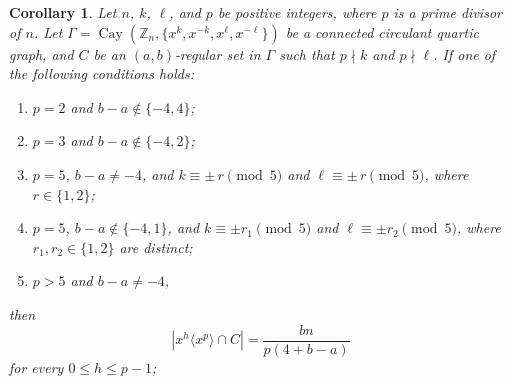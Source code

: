 \documentclass[10pt,a4paper]{amsart}
\newtheorem{cor}{Corollary}
\begin{document}
\begin{cor}\label{cor:coset-size2}
	Let $n$, $k$, $\ell$, and $p$ be positive integers, where $p$ is a prime divisor of $n$. Let $\Gamma=\operatorname{Cay}(\mathbb{Z}_n,\{x^k,x^{-k},x^\ell,x^{-\ell}\})$ be a connected circulant quartic graph, and $C$ be an $(a,b)$-regular set in $\Gamma$ such that $p\nmid k$ and $p\nmid \ell$. If one of the following conditions holds:
	\begin{enumerate}
		\item[(i)] $p=2$ and $b-a\notin\{-4,4\}$;
		\item[(ii)] $p=3$ and $b-a\notin\{-4,2\}$;
		\item[(iii)] $p=5$, $b-a\neq -4$, and
		$k\equiv \pm \, r \pmod{5}$ and $\ell\equiv \pm \, r \pmod{5}$,
		where $r\in\{1,2\}$;
		\item[(iv)] $p=5$, $b-a\notin\{-4,1\}$, and $k\equiv \pm r_1 \pmod{5}$ and $\ell\equiv \pm r_2 \pmod{5}$,
		where $r_1,r_2\in\{1,2\}$ are distinct;
		\item[(v)] $p>5$ and $b-a\neq -4$,
	\end{enumerate}
	then
	\[
	\left|x^h\langle x^p\rangle\cap C\right|
	=\frac{bn}{p(4+b-a)}
	\]
	for every $0\le h\le p-1$;
\end{cor}
\end{document}
